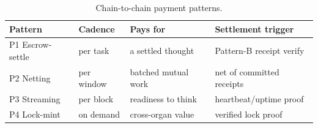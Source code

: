 \begin{table}[h]
\centering
\caption{Chain-to-chain payment patterns.}
\label{tab:payments}
\small
\begin{tabular}{@{}llll@{}}
\toprule
Pattern & Cadence & Pays for & Settlement trigger \\
\midrule
P1 Escrow-settle & per task & a settled thought & Pattern-B receipt verify \\
P2 Netting & per window & batched mutual work & net of committed receipts \\
P3 Streaming & per block & readiness to think & heartbeat/uptime proof \\
P4 Lock-mint & on demand & cross-organ value & verified lock proof \\
\bottomrule
\end{tabular}
\end{table}

